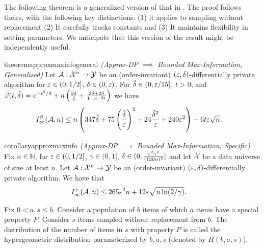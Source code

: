 The following theorem is a generalized version of that in \cite{RogersRST16}. The proof follows theirs, with the following key distinctions: (1) it applies to sampling without replacement (2) It carefully tracks constants and 
(3) It maintains flexibility in setting parameters. We anticipate that this version of the result might be independently useful.

\begin{restatable}{theorem}{approxmaxinfogeneral}\label{thm:approx-dp-implies-max-info}
    \emph{(Approx-DP $\implies$ Bounded Max-Information, Generalised)} Let $\mathcal{A}: \mathcal{X}^n \to \mathcal{Y}$ be an (order-invariant) $(\varepsilon,\delta)$-differentially
    private algorithm for $\varepsilon \in (0,1/2]$, $\delta \in \left (0,\varepsilon \right )$.
    For $\hat{\delta} \in (0,\varepsilon/15]$, $t>0$, and $\beta(t,\hat\delta) = e^{-t^2/2} + n\left(\frac{2\delta}{\hat{\delta}} + \frac{2\hat{\delta} + 2\delta}{1-e^{-3\varepsilon}}\right)$ we have
    \begin{align*}
        I^\beta_{\infty}(\mathcal{A},n)
        &\leq n\left( 347\hat{\delta} + 75 \left(\frac{\hat{\delta}}{\varepsilon} \right)^2 + 24\frac{\hat{\delta}^2}{\varepsilon}+ 240\varepsilon^2\right)
        + 6t\varepsilon\sqrt{n}.
    \end{align*}
\end{restatable}

\begin{restatable}{corollary}{approxmaxinfo}\label{cor:approx-dp-implies-max-info}
   \emph{(Approx-DP $\implies$ Bounded Max-Information, Specific)} Fix $n \in \mathbb{N}$, for $\varepsilon \in (0,1/2]$, $\gamma \in (0,1]$, $\delta \in (0,\frac{\varepsilon^2 \gamma^2}{(120n)^2}]$ and let $\mathcal{X}$ be a data universe of size at least $n$.
   Let $\mathcal{A}: \mathcal{X}^{n} \to \mathcal{Y}$ be an (order-invariant) $(\varepsilon,\delta)$-differentially
    private algorithm. We have that
    \begin{align*}
        I^\gamma_{\infty}(\mathcal{A},n)
        &\leq 265\varepsilon^2n + 12\varepsilon\sqrt{n\ln(2/\gamma)}.
    \end{align*}
\end{restatable}

\begin{definition}\label{def:hyper}
Fix $0 < a, s \leq b$. Consider a population of $b$ items of which $a$ items have a special property $P$. Consider $s$ items sampled without replacement from $b$. The distribution of the number of items in $s$ with property $P$ is called the hypergeometric distribution parameterized by $b,a,s$ (denoted by $H(b,a,s)$). 
\end{definition}

